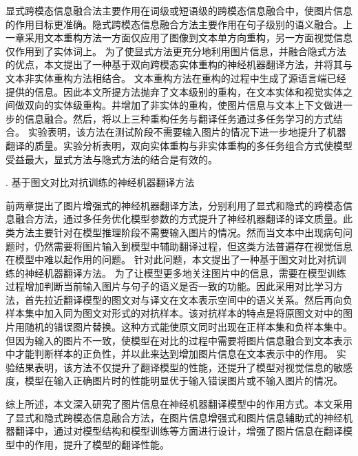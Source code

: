 显式跨模态信息融合法主要作用在词级或短语级的跨模态信息融合中，使图片信息的作用目标更准确。隐式跨模态信息融合方法主要作用在句子级别的语义融合。上一章采用文本重构方法一方面仅应用了图像到文本单方向重构，另一方面视觉信息仅作用到了实体词上。
为了使显式方法更充分地利用图片信息，并融合隐式方法的优点，本文提出了一种基于双向跨模态实体重构的神经机器翻译方法，并将其与文本非实体重构方法相结合。
文本重构方法在重构的过程中生成了源语言端已经提供的信息。因此本文所提方法抛弃了文本级别的重构，在文本实体和视觉实体之间做双向的实体级重构。并增加了非实体的重构，使图片信息与文本上下文做进一步的信息融合。然后，将以上三种重构任务与翻译任务通过多任务学习的方式结合。
实验表明，该方法在测试阶段不需要输入图片的情况下进一步地提升了机器翻译的质量。实验分析表明，双向实体重构与非实体重构的多任务组合方式使模型受益最大，显式方法与隐式方法的结合是有效的。

{. 基于图文对比对抗训练的神经机器翻译方法}

前两章提出了图片增强式的神经机器翻译方法，分别利用了显式和隐式的跨模态信息融合方法，通过多任务优化模型参数的方式提升了神经机器翻译的译文质量。此类方法主要针对在模型推理阶段不需要输入图片的情况。然而当文本中出现病句问题时，仍然需要将图片输入到模型中辅助翻译过程，但这类方法普遍存在视觉信息在模型中难以起作用的问题。
针对此问题，本文提出了一种基于图文对比对抗训练的神经机器翻译方法。
为了让模型更多地关注图片中的信息，需要在模型训练过程增加判断当前输入图片与句子的语义是否一致的功能。因此采用对比学习方法，首先拉近翻译模型的图文对与译文在文本表示空间中的语义关系。然后再向负样本集中加入同为图文对形式的对抗样本。该对抗样本的特点是将原图文对中的图片用随机的错误图片替换。这种方式能使原文同时出现在正样本集和负样本集中。但因为输入的图片不一致，使模型在对比的过程中需要将图片信息融合到文本表示中才能判断样本的正负性，并以此来达到增加图片信息在文本表示中的作用。
实验结果表明，该方法不仅提升了翻译模型的性能，还提升了模型对视觉信息的敏感度，模型在输入正确图片时的性能明显优于输入错误图片或不输入图片的情况。

综上所述，本文深入研究了图片信息在神经机器翻译模型中的作用方式。本文采用了显式和隐式跨模态信息融合方法，在图片信息增强式和图片信息辅助式的神经机器翻译中，通过对模型结构和模型训练等方面进行设计，增强了图片信息在翻译模型中的作用，提升了模型的翻译性能。


